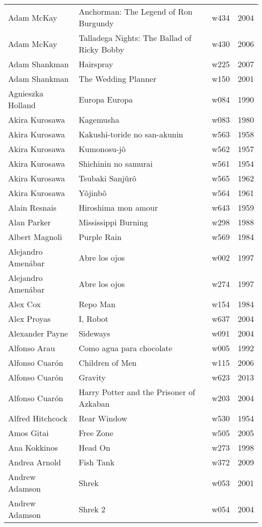 \documentclass{article}
\begin{document}
\begin {center}
\begin{longtable}{l p{10cm} l l}
Adam McKay & Anchorman: The Legend of Ron Burgundy & w434 & 2004 \\
Adam McKay & Talladega Nights: The Ballad of Ricky Bobby & w430 & 2006 \\
Adam Shankman & Hairspray & w225 & 2007 \\
Adam Shankman & The Wedding Planner & w150 & 2001 \\
Agnieszka Holland & Europa Europa & w084 & 1990 \\
Akira Kurosawa & Kagemusha & w083 & 1980 \\
Akira Kurosawa & Kakushi-toride no san-akunin & w563 & 1958 \\
Akira Kurosawa & Kumonosu-jô & w562 & 1957 \\
Akira Kurosawa & Shichinin no samurai & w561 & 1954 \\
Akira Kurosawa & Tsubaki Sanjûrô & w565 & 1962 \\
Akira Kurosawa & Yôjinbô & w564 & 1961 \\
Alain Resnais & Hiroshima mon amour & w643 & 1959 \\
Alan Parker & Mississippi Burning & w298 & 1988 \\
Albert Magnoli & Purple Rain & w569 & 1984 \\
Alejandro Amenábar & Abre los ojos & w002 & 1997 \\
Alejandro Amenábar & Abre los ojos & w274 & 1997 \\
Alex Cox & Repo Man & w154 & 1984 \\
Alex Proyas & I, Robot & w637 & 2004 \\
Alexander Payne & Sideways & w091 & 2004 \\
Alfonso Arau & Como agua para chocolate & w005 & 1992 \\
Alfonso Cuarón & Children of Men & w115 & 2006 \\
Alfonso Cuarón & Gravity & w623 & 2013 \\
Alfonso Cuarón & Harry Potter and the Prisoner of Azkaban & w203 & 2004 \\
Alfred Hitchcock & Rear Window & w530 & 1954 \\
Amos Gitai & Free Zone & w505 & 2005 \\
Ana Kokkinos & Head On & w273 & 1998 \\
Andrea Arnold & Fish Tank & w372 & 2009 \\
Andrew Adamson & Shrek & w053 & 2001 \\
Andrew Adamson & Shrek 2 & w054 & 2004 \\

\end{longtable}
\end{center}
\end{document}
